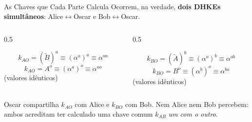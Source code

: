 \documentclass{beamer}
\begin{document}
\begin{frame}{As Chaves que Cada Parte Calcula}
    Ocorrem, na verdade, \textbf{dois DHKEs simultâneos}: Alice$\leftrightarrow$Oscar e Bob$\leftrightarrow$Oscar.
    \medskip
    \begin{columns}[T]
        \begin{column}{0.5\textwidth}
            \begin{tcolorbox}[colback=blue!5,colframe=blue!50!black,boxrule=0.5pt,title=\footnotesize Alice $\leftrightarrow$ Oscar]
                \footnotesize
                \[ k_{AO} = (\tilde{B})^{a} \equiv (\alpha^{o})^{a} \equiv \alpha^{oa} \]
                \[ k_{AO} = A^{o} \equiv (\alpha^{a})^{o} \equiv \alpha^{ao} \]
                \centering (valores idênticos)
            \end{tcolorbox}
        \end{column}
        \begin{column}{0.5\textwidth}
            \begin{tcolorbox}[colback=blue!5,colframe=blue!50!black,boxrule=0.5pt,title=\footnotesize Bob $\leftrightarrow$ Oscar]
                \footnotesize
                \[ k_{BO} = (\tilde{A})^{b} \equiv (\alpha^{o})^{b} \equiv \alpha^{ob} \]
                \[ k_{BO} = B^{o} \equiv (\alpha^{b})^{o} \equiv \alpha^{bo} \]
                \centering (valores idênticos)
            \end{tcolorbox}
        \end{column}
    \end{columns}
    \medskip
    \begin{tcolorbox}[colback=red!5,colframe=red!60!black,boxrule=0.5pt]
        \footnotesize
        Oscar compartilha $k_{AO}$ com Alice e $k_{BO}$ com Bob. \alert{Nem Alice nem Bob percebem}: ambos acreditam ter calculado uma chave comum $k_{AB}$ \emph{um com o outro}.
    \end{tcolorbox}
\end{frame}
\end{document}
